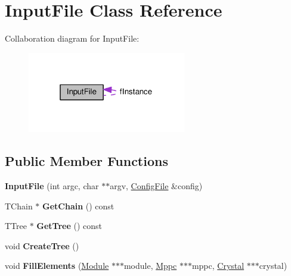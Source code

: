\hypertarget{classInputFile}{\section{Input\+File Class Reference}
\label{classInputFile}
}


Collaboration diagram for Input\+File\+:
\nopagebreak
\begin{figure}[H]
\begin{center}
\leavevmode
\includegraphics[width=196pt]{classInputFile__coll__graph}
\end{center}
\end{figure}
\subsection*{Public Member Functions}
\begin{DoxyCompactItemize}
\item 
\hypertarget{classInputFile_a1e310e7fc2da2ba81f2b959661625af6}{{\bfseries Input\+File} (int argc, char $\ast$$\ast$argv, \hyperlink{classConfigFile}{Config\+File} \&config)}\label{classInputFile_a1e310e7fc2da2ba81f2b959661625af6}

\item 
\hypertarget{classInputFile_a948e7cc1141e3f3b05fbbf836408a085}{T\+Chain $\ast$ {\bfseries Get\+Chain} () const }\label{classInputFile_a948e7cc1141e3f3b05fbbf836408a085}

\item 
\hypertarget{classInputFile_a2ab271cc4fac7e35b43d97b5901eeac8}{T\+Tree $\ast$ {\bfseries Get\+Tree} () const }\label{classInputFile_a2ab271cc4fac7e35b43d97b5901eeac8}

\item 
\hypertarget{classInputFile_a3dc20eebe07374d6abbc83c39744c464}{void {\bfseries Create\+Tree} ()}\label{classInputFile_a3dc20eebe07374d6abbc83c39744c464}

\item 
\hypertarget{classInputFile_ae4004a365b09e90a562732bc761e1cb5}{void {\bfseries Fill\+Elements} (\hyperlink{classModule}{Module} $\ast$$\ast$$\ast$module, \hyperlink{classMppc}{Mppc} $\ast$$\ast$$\ast$mppc, \hyperlink{classCrystal}{Crystal} $\ast$$\ast$$\ast$crystal)}\label{classInputFile_ae4004a365b09e90a562732bc761e1cb5}

\end{DoxyCompactItemize}
